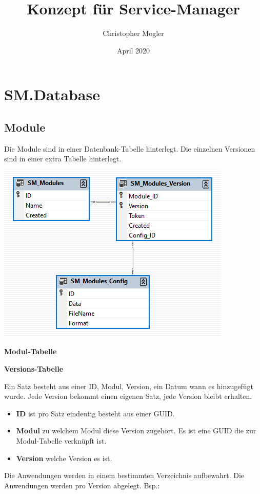 \documentclass{article}
\title{Konzept für Service-Manager}
\author{Christopher Mogler}
\date{April 2020}
\begin{document}
\maketitle
\tableofcontents
\newpage

\section{SM.Database}

\subsection{Module}

Die Module sind in einer Datenbank-Tabelle hinterlegt. 
Die einzelnen Versionen sind in einer extra Tabelle hinterlegt.

\includegraphics{db_modules}

\textbf{Modul-Tabelle}

\textbf{Versions-Tabelle}

Ein Satz besteht aus einer ID, Modul, Version, ein Datum wann es hinzugefügt wurde.
Jede Version bekommt einen eigenen Satz, jede Version bleibt erhalten.
\begin{itemize}
  \item \textbf{ID} ist pro Satz eindeutig besteht aus einer GUID.
  \item \textbf{Modul} zu welchem Modul diese Version zugehört. Es ist eine GUID die zur Modul-Tabelle verknüpft ist.
  \item \textbf{Version} welche Version es ist.
\end{itemize}
Die Anwendungen werden in einem bestimmten Verzeichnis aufbewahrt. Die Anwendungen werden pro Version abgelegt.
Bsp.: 
\end{document}
